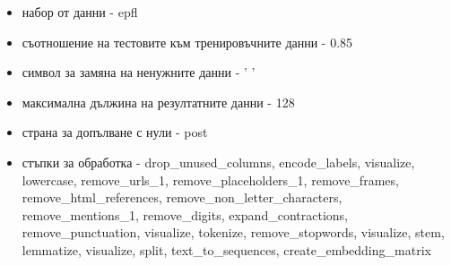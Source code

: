 \documentclass{article}
\begin{document}
\begin{itemize}
\begin{itemize}
\item набор от данни - epfl
\item съотношение на тестовите към тренировъчните данни - 0.85
\item символ за замяна на ненужните данни - ' '
\item максимална дължина на резултатните данни - 128
\item страна за допълване с нули - post
\item стъпки за обработка - drop\_unused\_columns, encode\_labels, visualize, lowercase, remove\_urls\_1,
remove\_placeholders\_1, remove\_frames, remove\_html\_references, remove\_non\_letter\_characters,
remove\_mentions\_1, remove\_digits, expand\_contractions, remove\_punctuation, visualize, tokenize,
remove\_stopwords, visualize, stem, lemmatize, visualize, split, text\_to\_sequences, create\_embedding\_matrix
\end{itemize}


\end{itemize}
\end{document}
